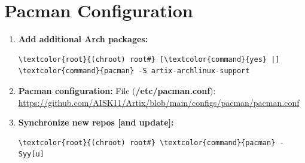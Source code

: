 \documentclass[10pt, a4paper, onecolumn, oneside, titlepage, openany]{book}
\begin{document}
\section{Pacman Configuration}
\begin{enumerate}
    \item \textbf{Add additional Arch packages:}
\begin{Verbatim}[commandchars=\\\{\}]
\textcolor{root}{(chroot) root#} [\textcolor{command}{yes} |] \textcolor{command}{pacman} -S artix-archlinux-support
\end{Verbatim}
    \item \textbf{Pacman configuration:}
\newline File (\textbf{\textcolor{file}{/etc/pacman.conf}}):
\newline \url{https://github.com/AISK11/Artix/blob/main/configs/pacman/pacman.conf}
    \item \textbf{Synchronize new repos [and update]:}
\begin{Verbatim}[commandchars=\\\{\}]
\textcolor{root}{(chroot) root#} \textcolor{command}{pacman} -Syy[u]
\end{Verbatim}
\end{enumerate}
\end{document}
